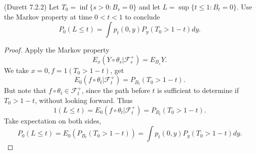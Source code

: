 \begin{problem}
	(Durett 7.2.2) Let $T_0 = \inf \{s > 0: B_s = 0\} $ and let $L = \sup \{t \le 1: B_t = 0\} $. Use the Markov property at time  $0 < t < 1$ to conclude
	\[
		P_0 (L \le t) = \int p_t (0,y) P_y (T_0 > 1 - t) dy
	.\] 
\end{problem}
\begin{proof}
	Apply the Markov property 
	\[
		E_x\left( Y \circ \theta_s | \mathcal{F}_s^+ \right) = E_{B_s} Y
	.\] 
	We take $x = 0, f = 1(T_0 > 1 - t)$, get
	 \[
		E_0\left( f \circ \theta_t | \mathcal{F}_t^+ \right) = P_{B_t} (T_0 > 1 - t)
	.\] 
	But note that $f \circ \theta_t \in \mathcal{F}_t^+$, since the path before $t$ is sufficient to determine if $T_0 > 1 -t$, without looking forward. Thus
	\[
		1\left( L \le t \right) = E_0(f \circ \theta_t | \mathcal{F}_t^+) = P_{B_t} (T_0 > 1 - t)
	.\] 
	Take expectation on both sides,
	\[
		P_0(L \le  t) = E_0\left( P_{B_t} (T_0 > 1 - t) \right)  = \int p_t (0,y) P_y (T_0 > 1 - t) dy
	.\] 
\end{proof}






